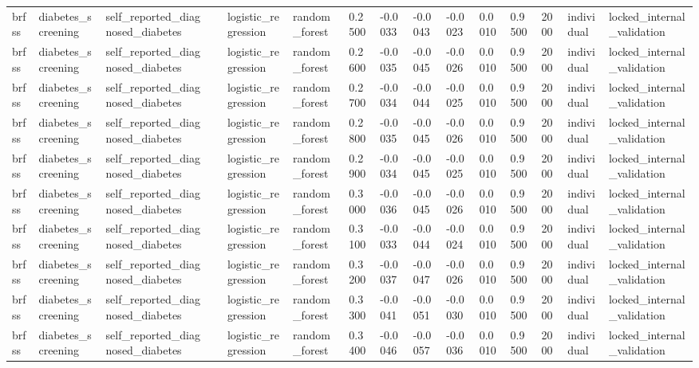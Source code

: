 \begin{tabular}{lllllllllllllll}
brfss & diabetes\_screening & self\_reported\_diagnosed\_diabetes &  & logistic\_regression & random\_forest & 0.2500 & -0.0033 & -0.0043 & -0.0023 & 0.0010 & 0.9500 & 2000 & individual & locked\_internal\_validation \\
brfss & diabetes\_screening & self\_reported\_diagnosed\_diabetes &  & logistic\_regression & random\_forest & 0.2600 & -0.0035 & -0.0045 & -0.0026 & 0.0010 & 0.9500 & 2000 & individual & locked\_internal\_validation \\
brfss & diabetes\_screening & self\_reported\_diagnosed\_diabetes &  & logistic\_regression & random\_forest & 0.2700 & -0.0034 & -0.0044 & -0.0025 & 0.0010 & 0.9500 & 2000 & individual & locked\_internal\_validation \\
brfss & diabetes\_screening & self\_reported\_diagnosed\_diabetes &  & logistic\_regression & random\_forest & 0.2800 & -0.0035 & -0.0045 & -0.0026 & 0.0010 & 0.9500 & 2000 & individual & locked\_internal\_validation \\
brfss & diabetes\_screening & self\_reported\_diagnosed\_diabetes &  & logistic\_regression & random\_forest & 0.2900 & -0.0034 & -0.0045 & -0.0025 & 0.0010 & 0.9500 & 2000 & individual & locked\_internal\_validation \\
brfss & diabetes\_screening & self\_reported\_diagnosed\_diabetes &  & logistic\_regression & random\_forest & 0.3000 & -0.0036 & -0.0045 & -0.0026 & 0.0010 & 0.9500 & 2000 & individual & locked\_internal\_validation \\
brfss & diabetes\_screening & self\_reported\_diagnosed\_diabetes &  & logistic\_regression & random\_forest & 0.3100 & -0.0033 & -0.0044 & -0.0024 & 0.0010 & 0.9500 & 2000 & individual & locked\_internal\_validation \\
brfss & diabetes\_screening & self\_reported\_diagnosed\_diabetes &  & logistic\_regression & random\_forest & 0.3200 & -0.0037 & -0.0047 & -0.0026 & 0.0010 & 0.9500 & 2000 & individual & locked\_internal\_validation \\
brfss & diabetes\_screening & self\_reported\_diagnosed\_diabetes &  & logistic\_regression & random\_forest & 0.3300 & -0.0041 & -0.0051 & -0.0030 & 0.0010 & 0.9500 & 2000 & individual & locked\_internal\_validation \\
brfss & diabetes\_screening & self\_reported\_diagnosed\_diabetes &  & logistic\_regression & random\_forest & 0.3400 & -0.0046 & -0.0057 & -0.0036 & 0.0010 & 0.9500 & 2000 & individual & locked\_internal\_validation \\

\end{tabular}
